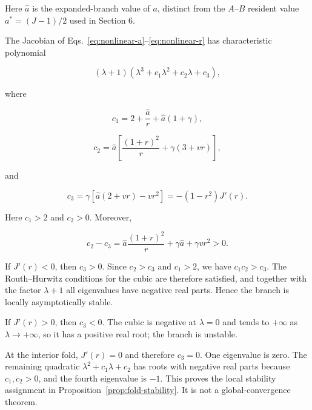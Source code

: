 \documentclass[11pt,a4paper]{article}
\begin{document}
Here $\hat a$ is the expanded-branch value of $a$, distinct from the $A$--$B$ resident
value $a^*=(J-1)/2$ used in Section 6.

The Jacobian of Eqs.~\eqref{eq:nonlinear-a}--\eqref{eq:nonlinear-r} has characteristic polynomial

\begin{equation}
(\lambda+1)\left(\lambda^3+c_1\lambda^2+c_2\lambda+c_3\right),
\label{eq:charpoly}
\end{equation}

where

\[
c_1=2+\frac{\hat a}{r}+\hat a(1+\gamma),
\]

\[
c_2=\hat a\left[\frac{(1+r)^2}{r}+\gamma(3+vr)\right],
\]

and

\begin{equation}
c_3=\gamma\left[\hat a(2+vr)-vr^2\right]
=-(1-r^2)J'(r).
\label{eq:c3}
\end{equation}

Here $c_1>2$ and $c_2>0$. Moreover,

\[
c_2-c_3
=
\hat a\frac{(1+r)^2}{r}+\gamma\hat a+\gamma vr^2>0.
\]

If $J'(r)<0$, then $c_3>0$. Since $c_2>c_3$ and $c_1>2$, we have $c_1c_2>c_3$. The Routh--Hurwitz conditions for the cubic are therefore satisfied, and together with the factor $\lambda+1$ all eigenvalues have negative real parts. Hence the branch is locally asymptotically stable.

If $J'(r)>0$, then $c_3<0$. The cubic is negative at $\lambda=0$ and tends to $+\infty$ as $\lambda\to+\infty$, so it has a positive real root; the branch is unstable.

At the interior fold, $J'(r)=0$ and therefore $c_3=0$. One eigenvalue is zero. The remaining quadratic $\lambda^2+c_1\lambda+c_2$ has roots with negative real parts because $c_1,c_2>0$, and the fourth eigenvalue is $-1$. This proves the local stability assignment in Proposition~\ref{prop:fold-stability}. It is not a global-convergence theorem.

\printbibliography
\end{document}
